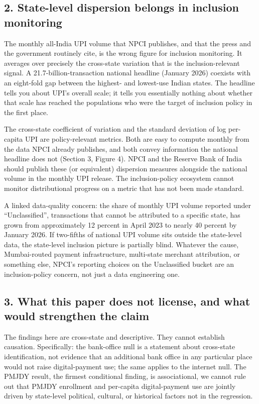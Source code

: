 \documentclass[
]{article}
\begin{document}
\subsection{2. State-level dispersion belongs in inclusion
monitoring}\label{state-level-dispersion-belongs-in-inclusion-monitoring}

The monthly all-India UPI volume that NPCI publishes, and that the press
and the government routinely cite, is the wrong figure for inclusion
monitoring. It averages over precisely the cross-state variation that is
the inclusion-relevant signal. A 21.7-billion-transaction national
headline (January 2026) coexists with an eight-fold gap between the
highest- and lowest-use Indian states. The headline tells you about
UPI's overall scale; it tells you essentially nothing about whether that
scale has reached the populations who were the target of inclusion
policy in the first place.

The cross-state coefficient of variation and the standard deviation of
log per-capita UPI are policy-relevant metrics. Both are easy to compute
monthly from the data NPCI already publishes, and both convey
information the national headline does not (Section 3, Figure 4). NPCI
and the Reserve Bank of India should publish these (or equivalent)
dispersion measures alongside the national volume in the monthly UPI
release. The inclusion-policy ecosystem cannot monitor distributional
progress on a metric that has not been made standard.

A linked data-quality concern: the share of monthly UPI volume reported
under ``Unclassified'', transactions that cannot be attributed to a
specific state, has grown from approximately 12 percent in April 2023 to
nearly 40 percent by January 2026. If two-fifths of national UPI volume
sits outside the state-level data, the state-level inclusion picture is
partially blind. Whatever the cause, Mumbai-routed payment
infrastructure, multi-state merchant attribution, or something else,
NPCI's reporting choices on the Unclassified bucket are an
inclusion-policy concern, not just a data engineering one.

\subsection{3. What this paper does not license, and what would
strengthen the
claim}\label{what-this-paper-does-not-license-and-what-would-strengthen-the-claim}

The findings here are cross-state and descriptive. They cannot establish
causation. Specifically: the bank-office null is a statement about
cross-state identification, not evidence that an additional bank office
in any particular place would not raise digital-payment use; the same
applies to the internet null. The PMJDY result, the firmest conditional
finding, is associational, we cannot rule out that PMJDY enrollment and
per-capita digital-payment use are jointly driven by state-level
political, cultural, or historical factors not in the regression.
\end{document}
